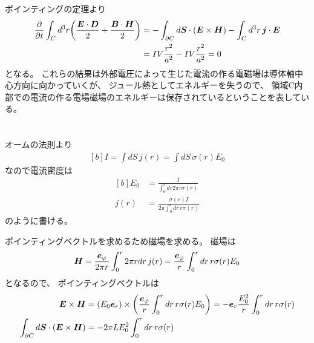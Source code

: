 \documentclass[../ap_2012.tex]{subfiles}
\begin{document}
ポインティングの定理より
\begin{equation}\begin{aligned}[b]
    \pdv{t}\int_C d^3r \qty(\frac{\vb*{E}\cdot \vb*{D}}{2}+\frac{\vb*{B}\cdot \vb*{H}}{2})
    &=  - \int_{\partial C} d\vb*{S}\cdot(\vb*{E}\times \vb*{H}) -\int_C d^3 r \,\vb*{j}\cdot \vb*{E}\\
    &= IV \frac{r^2}{a^2}-IV \frac{r^2}{a^2} =0
\end{aligned}\end{equation}
となる。
これらの結果は外部電圧によって生じた電流の作る電磁場は導体軸中心方向に向かっていくが、
ジュール熱としてエネルギーを失うので、
領域C内部での電流の作る電場磁場のエネルギーは保存されているということを表している。

\section{}
オームの法則より
\begin{equation}\begin{aligned}[b]
    I = \int dS\, j(r) = \int dS\, \sigma(r)E_0
\end{aligned}\end{equation}
なので電流密度は
\begin{equation}\begin{aligned}[b]
    E_0 &= \frac{I}{\int_0^r dr 2\pi r\sigma(r)}\\
    j(r) &= \frac{\sigma(r) I}{2\pi \int_0^r dr\, r\sigma(r)}
\end{aligned}\end{equation}
のように書ける。

ポインティングベクトルを求めるため磁場を求める。
磁場は
\begin{equation}\begin{aligned}[b]
    \vb*{H} = \frac{\vb*{e}_\varphi}{2\pi r}\int_{0}^{r}2\pi rdr\,j(r)
    =\frac{\vb*{e}_\varphi}{r}\int_{0}^{r} dr\, r\sigma(r)E_0
\end{aligned}\end{equation}
となるので、
ポインティングベクトルは
\begin{equation}\begin{aligned}[b]
    \vb*{E}\times \vb*{H}
    &= \qty(E_0\vb*{e}_r)\times\qty(\frac{\vb*{e}_\varphi}{r}\int_{0}^{r} dr\, r\sigma(r)E_0)
    =-\vb*{e}_r \frac{E_0^2}{r}\int_0^r dr\, r\sigma(r)\\
    \int_{\partial C} d\vb*{S} \cdot (\vb*{E}\times \vb*{H})
    &= -2\pi LE_0^2\int_0^r dr\, r\sigma(r)
\end{aligned}\end{equation}
\end{document}
